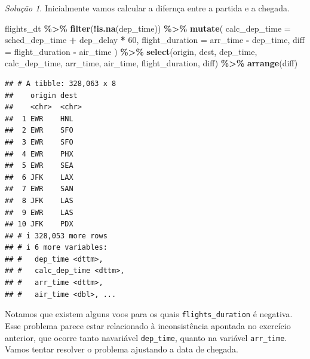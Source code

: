 \documentclass[
]{latex/krantz}
\newenvironment{Shaded}{\begin{snugshade}}{\end{snugshade}}
\newcommand{\AttributeTok}[1]{\textcolor[rgb]{0.13,0.29,0.53}{#1}}
\newcommand{\DecValTok}[1]{\textcolor[rgb]{0.00,0.00,0.81}{#1}}
\newcommand{\FunctionTok}[1]{\textcolor[rgb]{0.13,0.29,0.53}{\textbf{#1}}}
\newcommand{\NormalTok}[1]{#1}
\newcommand{\SpecialCharTok}[1]{\textcolor[rgb]{0.81,0.36,0.00}{\textbf{#1}}}
\theoremstyle{definition}
\theoremstyle{definition}
\theoremstyle{definition}
\theoremstyle{definition}
\theoremstyle{remark}
\newtheorem*{solution}{Solução}
\begin{document}
\begin{solution}

Inicialmente vamos calcular a difernça entre a partida e a chegada.

\begin{Shaded}
\begin{Highlighting}[]
\NormalTok{flights\_dt }\SpecialCharTok{\%\textgreater{}\%}
  \FunctionTok{filter}\NormalTok{(}\SpecialCharTok{!}\FunctionTok{is.na}\NormalTok{(dep\_time)) }\SpecialCharTok{\%\textgreater{}\%}
  \FunctionTok{mutate}\NormalTok{(}
    \AttributeTok{calc\_dep\_time =}\NormalTok{ sched\_dep\_time }\SpecialCharTok{+}\NormalTok{ dep\_delay }\SpecialCharTok{*} \DecValTok{60}\NormalTok{,}
    \AttributeTok{flight\_duration =}\NormalTok{ arr\_time }\SpecialCharTok{{-}}\NormalTok{ dep\_time,}
    \AttributeTok{diff =}\NormalTok{ flight\_duration }\SpecialCharTok{{-}}\NormalTok{ air\_time}
\NormalTok{  ) }\SpecialCharTok{\%\textgreater{}\%}
  \FunctionTok{select}\NormalTok{(origin, dest, dep\_time, calc\_dep\_time, arr\_time, air\_time, flight\_duration, diff) }\SpecialCharTok{\%\textgreater{}\%}
  \FunctionTok{arrange}\NormalTok{(diff)}
\end{Highlighting}
\end{Shaded}

\begin{verbatim}
## # A tibble: 328,063 x 8
##    origin dest 
##    <chr>  <chr>
##  1 EWR    HNL  
##  2 EWR    SFO  
##  3 EWR    SFO  
##  4 EWR    PHX  
##  5 EWR    SEA  
##  6 JFK    LAX  
##  7 EWR    SAN  
##  8 JFK    LAS  
##  9 EWR    LAS  
## 10 JFK    PDX  
## # i 328,053 more rows
## # i 6 more variables:
## #   dep_time <dttm>,
## #   calc_dep_time <dttm>,
## #   arr_time <dttm>,
## #   air_time <dbl>, ...
\end{verbatim}

Notamos que existem alguns voos para os quais \texttt{flights\_duration} é negativa. Esse problema parece estar relacionado à inconsistência apontada no exercício anterior, que ocorre tanto navariável \texttt{dep\_time}, quanto na variável \texttt{arr\_time}. Vamos tentar resolver o problema ajustando a data de chegada.


\end{solution}
\end{document}
